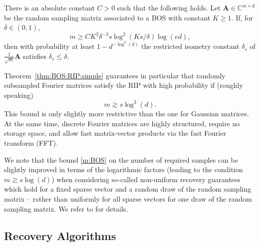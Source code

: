 \documentclass{svproc}
\newcommand{\corr}[1]{#1}
\newcommand{\bA}{\boldsymbol{A}}
\newcommand{\0}{\boldsymbol{0}}
\newcommand{\1}{\boldsymbol{1}}
\newcommand{\calD}{\mathcal{D}}
\def\C{\mathbb{C}}
\def\calD{\mathcal{D}}
\begin{document}
\begin{theorem}
\label{thm:BOS:RIP:simple} 
    There is an absolute constant $C > 0$ such that the following holds. Let $\bA \in \C^{m \times d}$ be the 
    random sampling matrix  
    associated to a BOS 
    with constant $K \geq 1$. 
    If, for $\delta \in (0,1)$, 
    \begin{equation}
    \label{m:BOS:RIP:simple}
        m \geq C K^2 \delta^{-2} s \log^2(Ks/\delta) \log(ed),
    \end{equation}
    then with probability at least $1- d^{-\log^3(d)}$ the restricted isometry constant $\delta_s$ of $\frac{1}{\sqrt{m}} \bA$
    satisfies $\delta_s \leq \delta$.
\end{theorem}


Theorem~\ref{thm:BOS:RIP:simple} guarantees in particular that randomly subsampled Fourier matrices satisfy the RIP with high probability if (roughly speaking)
\begin{equation}\label{m:BOS}
m \gtrsim s \log^3(d).
\end{equation}
This bound is only slightly more restrictive than the one for Gaussian matrices. At the same time, discrete Fourier matrices are highly structured, require no storage space, and allow fast matrix-vector products via the fast Fourier transform (FFT). 

We note \corr{that} the bound \eqref{m:BOS} on the number of \corr{required} samples can be slightly improved in terms of the logarithmic factors (leading to the condition $m \gtrsim s \log(d)$) when considering so-called non-uniform recovery guarantees which hold for a fixed sparse vector and a random draw of the random sampling matrix -- rather than uniformly for all sparse \corr{vectors} for one draw of the random sampling matrix. We refer to \cite{carota06-1,foucart2013mathematical,ra10} for details.

\subsection{Recovery Algorithms}
\end{document}
